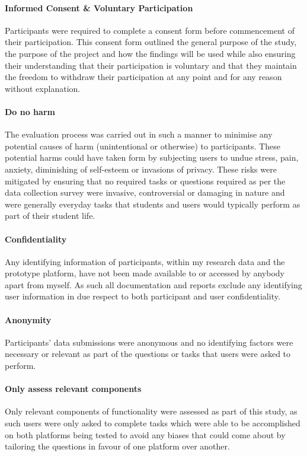 \documentclass[lettersize,journal]{IEEEtran}
\begin{document}
		\paragraph{Informed Consent \& Voluntary Participation}
		Participants were required to complete a consent form before commencement of their participation. This consent form outlined the general purpose
		of the study, the purpose of the project and how the findings will be used while also ensuring their understanding that their participation is
		voluntary and that they maintain the freedom to withdraw their participation at any point and for any reason without explanation.
     
      		 \paragraph{Do no harm}
       		The evaluation process was carried out in such a manner to minimise any potential causes of harm (unintentional or otherwise) to participants.
		These potential harms could have taken form by subjecting users to undue stress, pain, anxiety, diminishing of self-esteem or invasions of privacy.
		These risks were mitigated by ensuring that no required tasks or questions required as per the data collection survey were invasive, controversial
		or damaging in nature and were generally everyday tasks that students and users would typically perform as part of their student life.

		\paragraph{Confidentiality}
		Any identifying information of participants, within my research data and the prototype platform, have not been made available to or accessed
		by anybody apart from myself. As such all documentation and reports exclude any identifying user information in due respect to both participant
		and user confidentiality.

       		\paragraph{Anonymity}

       		Participants' data submissions were anonymous and no identifying factors were necessary or relevant as part of the questions or tasks that users 
		were asked to perform.

		\paragraph{Only assess relevant components}
		Only relevant components of functionality were assessed as part of this study, as such users were only asked to complete tasks which were able to be
		accomplished on both platforms being tested to avoid any biases that could come about by tailoring the questions in favour of one platform over 
		another.
\end{document}
